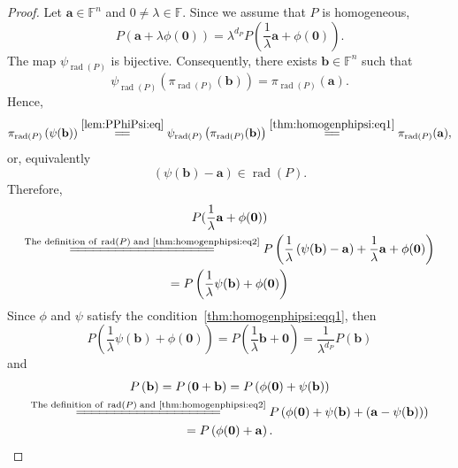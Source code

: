 \documentclass{elsarticle}
\DeclareMathOperator{\rad}{rad}
\def\F{{\mathbb F}}
\theoremstyle{definition}
\numberwithin{equation}{section}
\begin{document}
\begin{proof}
Let $\mathbf a \in \F^n$ and $0 \neq \lambda \in \F$. Since we assume that $P$ is homogeneous,
\begin{equation}\label{thm:homogenphipsi:eq5}
P\left(\mathbf a + \lambda \phi (\mathbf 0)\right) = \lambda^{d_P} P\left(\frac{1}{\lambda}\mathbf a + \phi (\mathbf 0)\right).
\end{equation}
The map $\psi_{\rad(P)}$ is bijective. Consequently, there exists $\mathbf b \in \F^n$ such that 
\begin{equation}\label{thm:homogenphipsi:eq1}
\psi_{\rad(P)}\left(\pi_{\rad(P)}(\mathbf b)\right) = \pi_{\rad(P)}(\mathbf a).
\end{equation}
Hence,
\begin{equation*}
\pi_{\rad(P)} \left(\psi(\mathbf b)\right) \overset{\eqref{lem:PPhiPsi:eq}}{=\joinrel=} \psi_{\rad(P)}\left(\pi_{\rad(P)}(\mathbf b)\right)  \overset{\eqref{thm:homogenphipsi:eq1}}{=\joinrel=} \pi_{\rad(P)}(\mathbf a),
\end{equation*}
or, equivalently
\begin{equation}\label{thm:homogenphipsi:eq2}
\left(\psi (\mathbf b) - \mathbf a\right) \in \rad(P). 
\end{equation}
Therefore,
\begin{multline}\label{thm:homogenphipsi:eq6}
P(\frac{1}{\lambda}\mathbf a + \phi (\mathbf 0))\\ \overset{\mbox{\scriptsize The definition of}\;\rad(P)\;\mbox{\scriptsize and~\eqref{thm:homogenphipsi:eq2}}}{=\joinrel=\joinrel=\joinrel=\joinrel=\joinrel=\joinrel=\joinrel=\joinrel=\joinrel=\joinrel=\joinrel=\joinrel=\joinrel=\joinrel=\joinrel=\joinrel=\joinrel=\joinrel=} P\left(\frac{1}{\lambda} \left(\psi (\mathbf b) - \mathbf a\right) + \frac{1}{\lambda}\mathbf a + \phi (\mathbf 0)\right)\\ = P\left(\frac{1}{\lambda}\psi (\mathbf b) + \phi (\mathbf 0)\right)
\end{multline}
Since $\phi$ and $\psi$ satisfy the condition~\eqref{thm:homogenphipsi:eqq1}, then
\begin{equation}\label{thm:homogenphipsi:eq3}
P\left(\frac{1}{\lambda}\psi (\mathbf b) + \phi (\mathbf 0)\right) = P\left(\frac{1}{\lambda}\mathbf b + \mathbf 0\right) = \frac{1}{\lambda^{d_P}}P\left(\mathbf b\right)
\end{equation}
and
\begin{multline}\label{thm:homogenphipsi:eq4}
P\left(\mathbf b\right) = P\left(\mathbf 0 + \mathbf b\right) = P\left(\phi(\mathbf 0) + \psi(\mathbf b)\right)\\ \overset{\mbox{\scriptsize The definition of}\;\rad(P)\;\mbox{\scriptsize and~\eqref{thm:homogenphipsi:eq2}}}{=\joinrel=\joinrel=\joinrel=\joinrel=\joinrel=\joinrel=\joinrel=\joinrel=\joinrel=\joinrel=\joinrel=\joinrel=\joinrel=\joinrel=\joinrel=\joinrel=\joinrel=\joinrel=}
P\left(\phi(\mathbf 0) + \psi(\mathbf b) + \left(\mathbf a - \psi(\mathbf b)\right)\right)\\
=  P\left(\phi(\mathbf 0) + \mathbf a\right).
\end{multline}



\end{proof}
\end{document}
